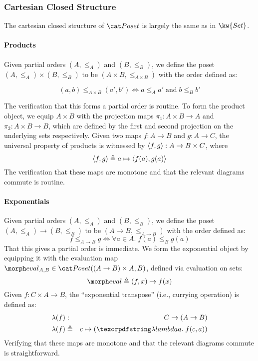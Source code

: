 




\subsubsection{Cartesian Closed Structure}

The cartesian closed structure of $\Poset$ is largely the
same as in $\kw{Set}$.

\paragraph{Products} Given  partial orders $(A, \leq_A)$ and $(B, \leq_B)$,
we define the poset $(A , \leq_A) \times (B, \leq_B)$ to be
$(A \times B, \leq_{A \times B})$ with the order defined as:

\begin{displaymath}
  (a,b) \leq_{A \times B} (a', b') \iff a \leq_A a' \;\mbox{and}\; b \leq_B b'
\end{displaymath}

The verification that this forms a partial order is routine. To
form the product object, we equip $A \times B$ with the projection
maps $\pi_1 : A \times B \to A$ and $\pi_2 : A \times B \to B$, which are
defined by the first and second projection on the underlying sets
respectively.
%
Given two maps $f : A \to B$ and $g : A \to C$, the universal property
of products is witnessed by $\langle{f,g}\rangle : A \to B \times C$, where
\begin{displaymath}
  \langle{f, g}\rangle \triangleq a \mapsto \langle{f(a), g(a)}\rangle
\end{displaymath}
%
The verification that these maps are monotone and that the relevant
diagrams commute is routine.

\paragraph{Exponentials} Given partial orders $(A, \leq_A)$ and $(B, \leq_B)$,
we define the poset $(A , \leq_A) \to (B, \leq_B)$ to be $(A \to B, \leq_{A \to B})$
with the order defined as:
%
\begin{displaymath}
  f \leq_{A \to B} g \iff \forall a \in A.\; f(a) \leq_B g(a)
\end{displaymath}
That this gives a partial order is immediate. We form the exponential object by
equipping it with the evaluation map $\eval_{A,B} \in \Poset((A \to B) \times A, B)$,
defined via evaluation on sets:
\begin{displaymath}
  \eval \triangleq (f,x) \mapsto f(x)
\end{displaymath}
%
Given $f : C \times A \to B$, the ``exponential transpose'' (i.e., currying
operation) is defined as:
\begin{eqnarray*}
  \lambda(f) & : & C \to (A \to B) \\
  \lambda(f) & \triangleq & c \mapsto (\fnof{a} f(c,a))
\end{eqnarray*}
Verifying that these maps are monotone and that the relevant
diagrams commute is straightforward.

